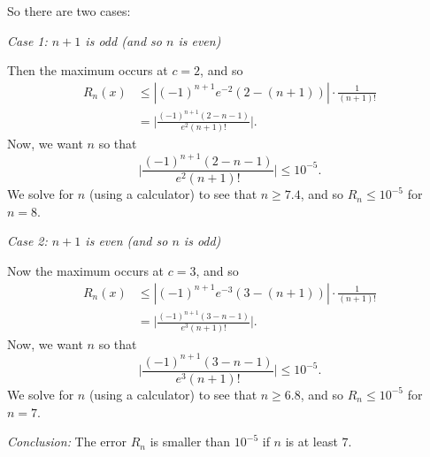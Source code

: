 \documentclass[]{ximera}
\begin{document}
\begin{problem}
\begin{freeResponse}
\begin{enumerate}
	So there are two cases:
	
	\vskip 10pt
	
	{\it Case 1:  $n+1$ is odd (and so $n$ is even)}
	
	Then the maximum occurs at $c=2$, and so
		\begin{align*}
		R_n(x) &\leq | (-1)^{n+1} e^{-2} (2 - (n+1)) | \cdot \frac{1}{(n+1)!}  \\
		&= \biggr| \frac{(-1)^{n+1} (2-n-1)}{e^2 (n+1)!} \biggr| .
		\end{align*}
	Now, we want $n$ so that 
		\[
		\biggr| \frac{(-1)^{n+1} (2-n-1)}{e^2 (n+1)!} \biggr| \leq 10^{-5}.
		\]
	We solve for $n$ (using a calculator) to see that $n \geq 7.4$, and so $R_n \leq 10^{-5}$ for $n = 8$.
	
	\vskip 10pt
	
	{\it Case 2:  $n+1$ is even (and so $n$ is odd)}
	
	Now the maximum occurs at $c=3$, and so
		\begin{align*}
		R_n(x) &\leq | (-1)^{n+1} e^{-3} (3 - (n+1)) | \cdot \frac{1}{(n+1)!}  \\
		&= \biggr| \frac{(-1)^{n+1} (3-n-1)}{e^3 (n+1)!} \biggr| .
		\end{align*}
	Now, we want $n$ so that 
		\[
		\biggr| \frac{(-1)^{n+1} (3-n-1)}{e^3 (n+1)!} \biggr| \leq 10^{-5}.
		\]
	We solve for $n$ (using a calculator) to see that $n \geq 6.8$, and so $R_n \leq 10^{-5}$ for $n = 7$.
	
	\vskip 10pt
	
	{\it Conclusion:} The error $R_n$ is smaller than $10^{-5}$ if $n$ is at least $7$.
	
	
	
	\end{enumerate}
	\end{freeResponse}

\end{problem}
\end{document}
